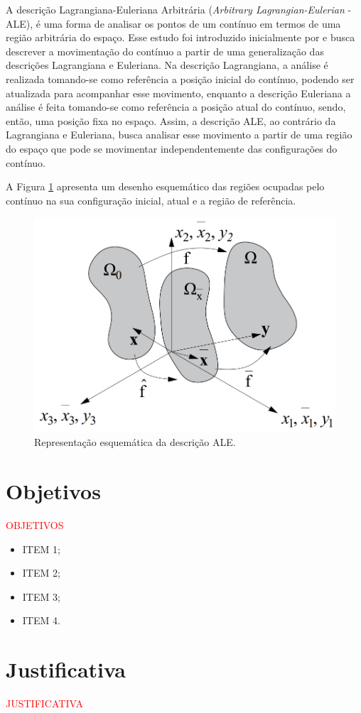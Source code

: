 \documentclass[_ArquivoPrincipal.tex]{subfiles}
\begin{document}
A descrição Lagrangiana-Euleriana Arbitrária (\textit{Arbitrary Lagrangian-Eulerian} - ALE), é uma forma de analisar os pontos de um contínuo em termos de uma região arbitrária do espaço. Esse estudo foi introduzido inicialmente por  e busca descrever a movimentação do contínuo a partir de uma generalização das descrições Lagrangiana e Euleriana. Na descrição Lagrangiana, a análise é realizada tomando-se como referência a posição inicial do contínuo, podendo ser atualizada para acompanhar esse movimento, enquanto a descrição Euleriana a análise é feita tomando-se como referência a posição atual do contínuo, sendo, então, uma posição fixa no espaço. Assim, a descrição ALE, ao contrário da Lagrangiana e Euleriana, busca analisar esse movimento a partir de uma região do espaço que pode se movimentar independentemente das configurações do contínuo.

A Figura \ref{fig:ALE} apresenta um desenho esquemático das regiões ocupadas pelo contínuo na sua configuração inicial, atual e a região de referência.

\begin{figure}[h]
    \centering
    \includegraphics[width=0.5\linewidth]{Figuras/ALE1.png}
    \caption{Representação esquemática da descrição ALE.}
    \label{fig:ALE}
\end{figure}

\section{Objetivos}

\textcolor{red}{OBJETIVOS}

\begin{itemize}
    \item ITEM 1;

    \item ITEM 2;

    \item ITEM 3;

    \item ITEM 4.
\end{itemize}

\section{Justificativa}

\textcolor{red}{JUSTIFICATIVA}
\end{document}
